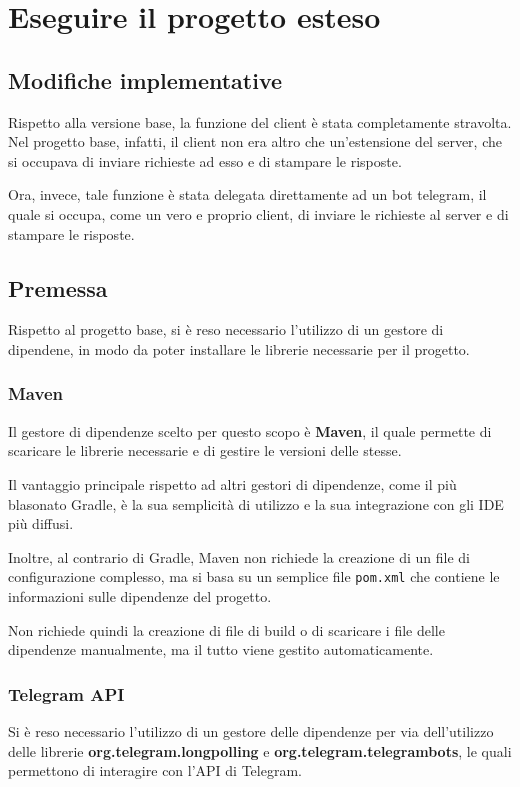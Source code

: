 \section{Eseguire il progetto esteso}

\subsection{Modifiche implementative}

Rispetto alla versione base,  la funzione del client è stata completamente stravolta. Nel progetto base, infatti, il client non era altro che un'estensione del server, che si occupava di inviare richieste ad esso e di stampare le risposte. 

Ora, invece, tale funzione è stata delegata direttamente ad un bot telegram, il quale si occupa, come un vero e proprio client, di inviare le richieste al server e di stampare le risposte.


\subsection{Premessa}

Rispetto al progetto base, si è reso necessario l'utilizzo di un gestore di dipendene, in modo da poter installare le librerie necessarie per il progetto. 

\subsubsection*{Maven}

Il gestore di dipendenze scelto per questo scopo è \textbf{Maven}, il quale permette di scaricare le librerie necessarie e di gestire le versioni delle stesse.

Il vantaggio principale rispetto ad altri gestori di dipendenze, come il più blasonato Gradle, è la sua semplicità di utilizzo e la sua integrazione con gli IDE più diffusi. 

Inoltre, al contrario di Gradle, Maven non richiede la creazione di un file di configurazione complesso, ma si basa su un semplice file \texttt{pom.xml} che contiene le informazioni sulle dipendenze del progetto. 

Non richiede quindi la creazione di file di build o di scaricare i file delle dipendenze manualmente, ma il tutto viene gestito automaticamente. 

\subsubsection*{Telegram API}

Si è reso necessario l'utilizzo di un gestore delle dipendenze per via dell'utilizzo delle librerie \textbf{org.telegram.longpolling} e \textbf{org.telegram.telegrambots}, le quali permettono di interagire con l'API di Telegram. 

